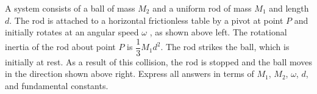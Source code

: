 \documentclass{../../oss-apphys-exam}
\begin{document}
\begin{questions}
  \newpage
  
  \question A system consists of a ball of mass $M_2$ and a uniform rod of mass
  $M_1$ and length $d$. The rod is attached to a horizontal frictionless table
  by a pivot at point $P$ and initially rotates at an angular speed $\omega$ ,
  as shown above left. The rotational inertia of the rod about point $P$ is
  $\dfrac13M_1d^2$. The rod strikes the ball, which is initially at rest. As a
  result of this collision, the rod is stopped and the ball moves in the
  direction shown above right. Express all answers in terms of $M_1$, $M_2$,
  $\omega$, $d$, and fundamental constants.
\end{questions}
\end{document}
